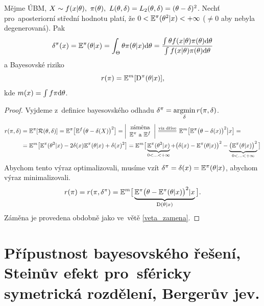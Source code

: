 \begin{theorem}[!!!Vyhazovací!!!]\label{vyhazovaci}
	Mějme ÚBM, $X\sim f(x|\theta),~\pi(\theta),~L(\theta,\delta)=L_2(\theta,\delta)=(\theta-\delta)^2$. Nechť pro~aposteriorní střední hodnotu platí, že $0<\mathbb{E}^\pi(\theta^2|x)<+\infty$ ($\neq 0$ aby nebyla degenerovaná). Pak $$\delta^\pi(x)=\mathbb{E}^\pi(\theta|x)=\int_\Theta \theta\pi(\theta| x)\mathrm{d}\theta=\frac{\int\theta f(x|\theta)\pi(\theta)\mathrm{d}\theta}{\int f(x|\theta)\pi(\theta)\mathrm{d}\theta}$$
	a Bayesovské riziko 
	$$r(\pi)=\mathbb{E}^m[\mathrm{D}^\pi(\theta|x)],$$
	kde $m(x)=\int f\pi\mathrm{d}\theta$.
	\begin{proof}
	Vyjdeme z~definice bayesovského odhadu $\delta^\pi=\mathop{\mathrm{argmin}}\limits_{\delta} r(\pi,\delta)$.
		\[
		\begin{split}
		r(\pi,\delta)&=\E^\pi[\RF(\t,\delta)]=\E^\pi\big[\E^f\big(\t-\delta(X)\big)^2\big]=\left|\begin{array}{c}
		\text{záměna} \\ \E^\pi\text{ a~}\E^f		
		\end{array}
		\right|\equal{\text{viz dříve}}\E^m\big[\E^\pi\big(\t-\delta(x)\big)^2\big|x\big]=\\&=\E^m\big[\E^\pi(\t^2|x)-2\delta(x)\E^\pi(\t|x)+\delta(x)^2\big]=\E^m\big[\underbrace{\E^\pi(\t^2|x)}_{0<...<+\infty}+\big(\delta(x)-\E^\pi(\t|x)\big)^2-\underbrace{\big(\E^\pi(\t|x)\big)^2}_{0<...<+\infty}\big]
		\end{split}
		\] Abychom tento výraz optimalizovali, musíme vzít $\delta^{\pi}=\delta(x)=\mathbb{E}^\pi(\theta|x)$, abychom výraz minimalizovali.
		$$ r(\pi)=r(\pi,\delta^\pi)=\mathbb{E}^m\big[\underbrace{\mathbb{E}^\pi\big(\theta-\mathbb{E}^\pi(\theta|x)\big)^2|x}_{\mathrm{D}(\theta|x)}\big].$$
		Záměna je provedena obdobně jako ve~větě \ref{veta_zamena}.
	\end{proof}
\end{theorem}

\chapter{Přípustnost bayesovského řešení, Steinův efekt pro~sféricky symetrická rozdělení, Bergerův jev.}

